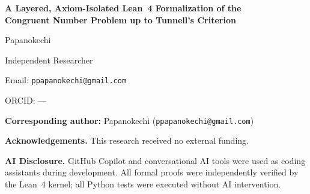 \documentclass[11pt,a4paper]{article}
\begin{document}
\thispagestyle{empty}

\begin{center}
{\LARGE\bfseries A Layered, Axiom-Isolated Lean~4 Formalization of the \\[4pt]
Congruent Number Problem up to Tunnell's Criterion}

\bigskip\bigskip

{\large Papanokechi}

\medskip

Independent Researcher

\medskip

Email: \texttt{ppapanokechi@gmail.com}

\medskip

ORCID: ---

\end{center}

\bigskip

\noindent\textbf{Corresponding author:} Papanokechi
(\texttt{ppapanokechi@gmail.com})

\bigskip

\noindent\textbf{Acknowledgements.}
This research received no external funding.

\bigskip

\noindent\textbf{AI Disclosure.}
GitHub Copilot and conversational AI tools were used as coding
assistants during development. All formal proofs were independently
verified by the Lean~4 kernel; all Python tests were executed without
AI intervention.
\end{document}

